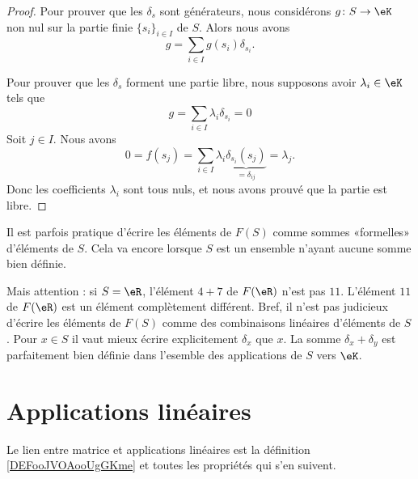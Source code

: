 \begin{proof}
    Pour prouver que les \( \delta_s\) sont générateurs, nous considérons \( g\colon S\to \eK\) non nul sur la partie finie \( \{ s_i \}_{i\in I}\) de \( S\). Alors nous avons
    \begin{equation}
        g=\sum_{i\in I}g(s_i)\delta_{s_i}.
    \end{equation}
    
    Pour prouver que les \( \delta_s\) forment une partie libre, nous supposons avoir \( \lambda_i\in \eK\) tels que
    \begin{equation}
        g=\sum_{i\in I}\lambda_i\delta_{s_i}=0
    \end{equation}
    Soit \( j\in I\). Nous avons
    \begin{equation}
        0=f(s_j)=\sum_{i\in I}\lambda_i \underbrace{\delta_{s_i}(s_j)}_{=\delta_{ij}}=\lambda_j.
    \end{equation}
    Donc les coefficients \( \lambda_i\) sont tous nuls, et nous avons prouvé que la partie est libre.
\end{proof}

Il est parfois pratique d'écrire les éléments de \( F(S)\) comme sommes «formelles» d'éléments de \( S\). Cela va encore lorsque \( S\) est un ensemble n'ayant aucune somme bien définie. 

Mais attention : si \( S=\eR\), l'élément \( 4+7\) de \( F(\eR)\) n'est pas \( 11\). L'élément \( 11\) de \( F(\eR)\) est un élément complètement différent. Bref, il n'est pas judicieux d'écrire les éléments de \( F(S)\) comme des combinaisons linéaires d'éléments de \( S\). Pour \( x\in S\) il vaut mieux écrire explicitement \( \delta_x\) que \( x\). La somme \( \delta_x+\delta_y\) est parfaitement bien définie dans l'esemble des applications de \( S\) vers \( \eK\).

\section{Applications linéaires}

Le lien entre matrice et applications linéaires est la définition \ref{DEFooJVOAooUgGKme} et toutes les propriétés qui s'en suivent.

